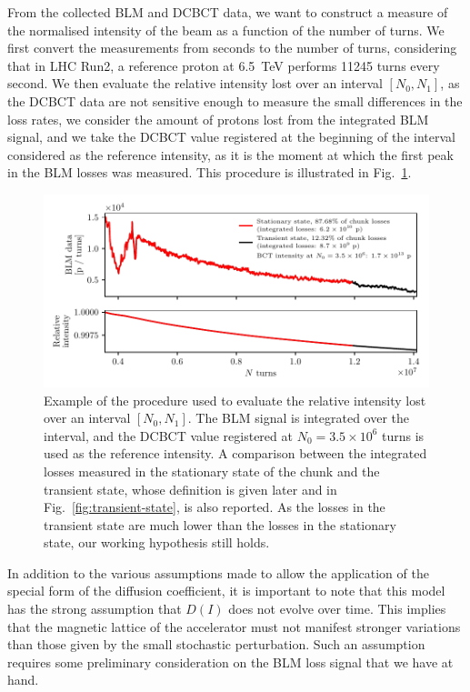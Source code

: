 From the collected BLM and DCBCT data, we want to construct a measure of the normalised intensity of the beam as a function of the number of turns. We first convert the measurements from seconds to the number of turns, considering that in LHC Run2, a reference proton at \SI{6.5}{TeV} performs 11245 turns every second. We then evaluate the relative intensity lost over an interval $[N_0, N_1]$, as the DCBCT data are not sensitive enough to measure the small differences in the loss rates, we consider the amount of protons lost from the integrated BLM signal, and we take the DCBCT value registered at the beginning of the interval considered as the reference intensity, as it is the moment at which the first peak in the BLM losses was measured. This procedure is illustrated in Fig.~\ref{fig:blm-to-intensity}.

\begin{figure}[th]
    \centering
    \includegraphics[width=1.0\textwidth]{5_wire_compensators_LHC/figs/stationary_transient_example_chunk.pdf}
    \caption{Example of the procedure used to evaluate the relative intensity lost over an interval $[N_0, N_1]$. The BLM signal is integrated over the interval, and the DCBCT value registered at $N_0=3.5\times10^6$ turns is used as the reference intensity. A comparison between the integrated losses measured in the stationary state of the chunk and the transient state, whose definition is given later and in Fig.~\ref{fig:transient-state}, is also reported. As the losses in the transient state are much lower than the losses in the stationary state, our working hypothesis still holds.}
    \label{fig:blm-to-intensity}
\end{figure}

In addition to the various assumptions made to allow the application of the special form of the diffusion coefficient, it is important to note that this model has the strong assumption that $D(I)$ does not evolve over time. This implies that the magnetic lattice of the accelerator must not manifest stronger variations than those given by the small stochastic perturbation. Such an assumption requires some preliminary consideration on the BLM loss signal that we have at hand.


